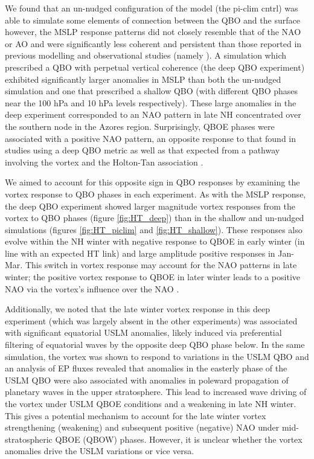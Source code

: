 We found that an un-nudged configuration of the model (the pi-clim cntrl) was able to simulate some elements of connection between the QBO and the surface however, the MSLP response patterns did not closely resemble that of the NAO or AO and were significantly less coherent and persistent than those reported in previous modelling and observational studies (namely \cite{andrewsObserved2019d}). A simulation which prescribed a QBO with perpetual vertical coherence (the deep QBO experiment) exhibited significantly larger anomalies in MSLP than both the un-nudged simulation and one that prescribed a shallow QBO (with different QBO phases near the 100 hPa and 10 hPa levels respectively). These large anomalies in the deep experiment corresponded to an NAO pattern in late NH concentrated over the southern node in the Azores region. Surprisingly, QBOE phases were associated with a positive NAO pattern, an opposite response to that found in studies using a deep QBO metric \citep{andrewsObserved2019d} as well as that expected from a pathway involving the vortex and the Holton-Tan association \citep{HoltonJamesRTan1980}.

We aimed to account for this opposite sign in QBO responses by examining the vortex response to QBO phases in each experiment. As with the MSLP response, the deep QBO experiment showed larger magnitude vortex responses from the vortex to QBO phases (figure \ref{fig:HT_deep}) than in the shallow and un-nudged simulations (figures \ref{fig:HT_piclim} and \ref{fig:HT_shallow}). These responses also evolve within the NH winter with negative response to QBOE in early winter (in line with an expected HT link) and large amplitude positive responses in Jan-Mar. This switch in vortex response may account for the NAO patterns in late winter; the positive vortex response to QBOE in later winter leads to a positive NAO via the vortex's influence over the NAO \citep{charlton-perezInfluence2018e}. 

Additionally, we noted that the late winter vortex response in this deep experiment (which was largely absent in the other experiments) was associated with significant equatorial USLM anomalies, likely induced via preferential filtering of equatorial waves by the opposite deep QBO phase below. In the same simulation, the vortex was shown to respond to variations in the USLM QBO and an analysis of EP fluxes revealed that anomalies in the easterly phase of the USLM QBO were also associated with anomalies in poleward propagation of planetary waves in the upper stratosphere. This lead to increased wave driving of the vortex under USLM QBOE conditions and a weakening in late NH winter. This gives a potential mechanism to account for the late winter vortex strengthening (weakening) and subsequent positive (negative) NAO under mid-stratospheric QBOE (QBOW) phases. However, it is unclear whether the vortex anomalies drive the USLM variations or vice versa.

